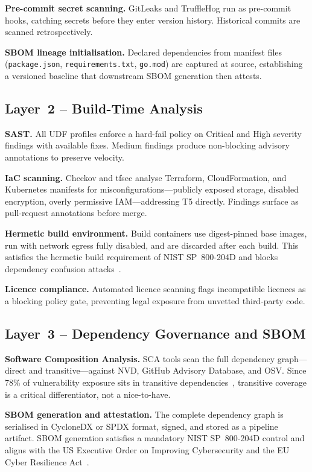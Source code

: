 \documentclass[letterpaper, 10pt, conference]{ieeeconf}
\begin{document}
\textbf{Pre-commit secret scanning.} GitLeaks and TruffleHog run as
pre-commit hooks, catching secrets before they enter version history.
Historical commits are scanned retrospectively.

\textbf{SBOM lineage initialisation.} Declared dependencies from
manifest files (\texttt{package.json}, \texttt{requirements.txt},
\texttt{go.mod}) are captured at source, establishing a versioned
baseline that downstream SBOM generation then attests.

\subsection{Layer~2 -- Build-Time Analysis}

\textbf{SAST.} All UDF profiles enforce a hard-fail policy on Critical
and High severity findings with available fixes. Medium findings produce
non-blocking advisory annotations to preserve velocity.

\textbf{IaC scanning.} Checkov and tfsec analyse Terraform,
CloudFormation, and Kubernetes manifests for misconfigurations---publicly
exposed storage, disabled encryption, overly permissive IAM---addressing
T5 directly. Findings surface as pull-request annotations before merge.

\textbf{Hermetic build environment.} Build containers use digest-pinned
base images, run with network egress fully disabled, and are discarded
after each build. This satisfies the hermetic build requirement of NIST
SP~800-204D and blocks dependency confusion attacks~\cite{nist2024}.

\textbf{Licence compliance.} Automated licence scanning flags
incompatible licences as a blocking policy gate, preventing legal
exposure from unvetted third-party code.

\subsection{Layer~3 -- Dependency Governance and SBOM}

\textbf{Software Composition Analysis.} SCA tools scan the full
dependency graph---direct and transitive---against NVD, GitHub Advisory
Database, and OSV. Since 78\% of vulnerability exposure sits in
transitive dependencies~\cite{singh2020}, transitive coverage is a
critical differentiator, not a nice-to-have.

\textbf{SBOM generation and attestation.} The complete dependency graph
is serialised in CycloneDX or SPDX format, signed, and stored as a
pipeline artifact. SBOM generation satisfies a mandatory NIST SP~800-204D
control and aligns with the US Executive Order on Improving Cybersecurity
and the EU Cyber Resilience Act~\cite{nist2024}.
\end{document}
